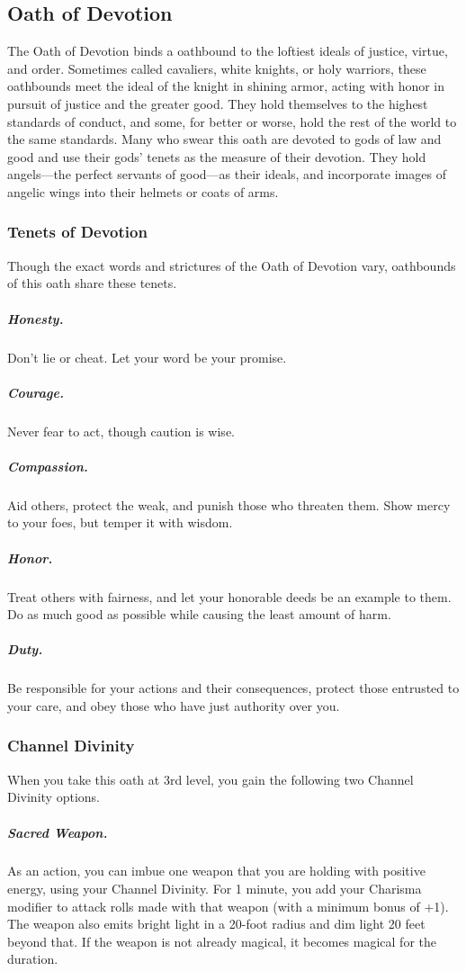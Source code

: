 \subsection{Oath of Devotion}

The Oath of Devotion binds a oathbound to the loftiest ideals of justice, virtue, and order. Sometimes called cavaliers, white knights, or holy warriors, these oathbounds meet the ideal of the knight in shining armor, acting with honor in pursuit of justice and the greater good. They hold themselves to the highest standards of conduct, and some, for better or worse, hold the rest of the world to the same standards. Many who swear this oath are devoted to gods of law and good and use their gods' tenets as the measure of their devotion. They hold angels—the perfect servants of good—as their ideals, and incorporate images of angelic wings into their helmets or coats of arms.

\subsubsection{Tenets of Devotion}

Though the exact words and strictures of the Oath of Devotion vary, oathbounds of this oath share these tenets.

\subparagraph*{Honesty.} Don't lie or cheat. Let your word be your promise.

\subparagraph*{Courage.} Never fear to act, though caution is wise.

\subparagraph*{Compassion.} Aid others, protect the weak, and punish those who threaten them. Show mercy to your foes, but temper it with wisdom.

\subparagraph*{Honor.} Treat others with fairness, and let your honorable deeds be an example to them. Do as much good as possible while causing the least amount of harm.

\subparagraph*{Duty.} Be responsible for your actions and their consequences, protect those entrusted to your care, and obey those who have just authority over you.                  

\subsubsection{Channel Divinity}

When you take this oath at 3rd level, you gain the following two Channel Divinity options.

\subparagraph*{Sacred Weapon.} As an action, you can imbue one weapon that you are holding with positive energy, using your Channel Divinity. For 1 minute, you add your Charisma modifier to attack rolls made with that weapon (with a minimum bonus of +1). The weapon also emits bright light in a 20-foot radius and dim light 20 feet beyond that. If the weapon is not already magical, it becomes magical for the duration.

